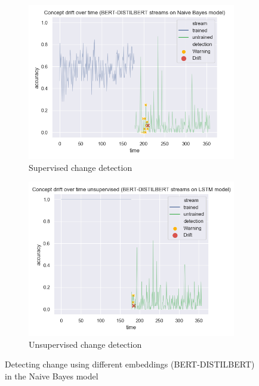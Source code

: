 \documentclass[12pt]{extreport}
\begin{document}
\begin{figure}[H]
\centering
\begin{subfigure}{.5\textwidth}
  \centering
  \includegraphics[width=\linewidth]{assets/detecting-change/diff_embed_nb_wos_1_BERT_DISTILBERT.png}
  \caption{Supervised change detection}
  \label{fig:nb-diff-embed-super-B-D}
\end{subfigure}%
\begin{subfigure}{.5\textwidth}
  \centering
  \includegraphics[width=\linewidth]{assets/detecting-change/diff_embed_nb_wos_1_BERT_DISTILBERT_unsupervised.png}
  \caption{Unsupervised change detection}
  \label{fig:nb-diff-embed-unsuper-B-D}
\end{subfigure}
\caption{Detecting change using different embeddings (BERT-DISTILBERT) in the Naive Bayes model}
\label{fig:nb-diff-embed-B-D}
\end{figure}
\end{document}
